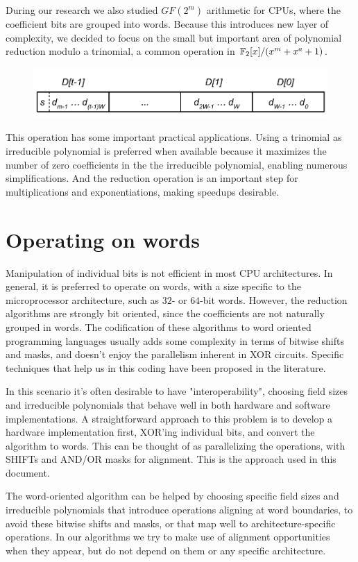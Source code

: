 During our research we also studied $GF(2^m)$ arithmetic for CPUs, where the coefficient bits are grouped into words. Because this introduces new layer of complexity, we decided to focus on the small but important area of polynomial reduction modulo a trinomial, a common operation in $\mathbb{F}_2[x]/(x^m+x^a+1)$.

\begin{figure}[htb]
  \centering
  \includegraphics[width = .55\columnwidth]{figures/element-word.pdf}
\end{figure}

This operation has some important practical applications. Using a trinomial as irreducible polynomial is  preferred when available because it maximizes the number of zero coefficients in the the irreducible polynomial, enabling numerous simplifications. And the reduction operation is an important step for multiplications and exponentiations, making speedups desirable.

\section{Operating on words}\label{operating-on-words}

Manipulation of individual bits is not efficient in most CPU architectures. In general, it is preferred to operate on words, with a size specific to the microprocessor architecture, such as $32$- or $64$-bit words. However, the reduction algorithms are strongly bit oriented, since the coefficients are not naturally grouped in words. The codification of these algorithms to word oriented programming languages usually adds some complexity in terms of bitwise shifts and masks, and doesn't enjoy the parallelism inherent in XOR circuits. Specific techniques that help us in this coding have been proposed in the literature\cite{Hilewitz2008}. 

In this scenario it's often desirable to have "interoperability", choosing field sizes and irreducible polynomials that behave well
in both hardware and software implementations. A straightforward
approach to this problem is to develop a hardware implementation first,
XOR'ing individual bits, and convert the algorithm to words. This can be
thought of as parallelizing the operations, with SHIFTs and AND/OR masks
for alignment. This is the approach used in this document.

The word-oriented algorithm can be helped by choosing specific field sizes and irreducible polynomials that introduce operations aligning at word boundaries, to avoid these bitwise shifts and masks, or that map well to architecture-specific operations. In our algorithms we try to make use of alignment opportunities when they appear, but do not depend on them or any specific architecture.